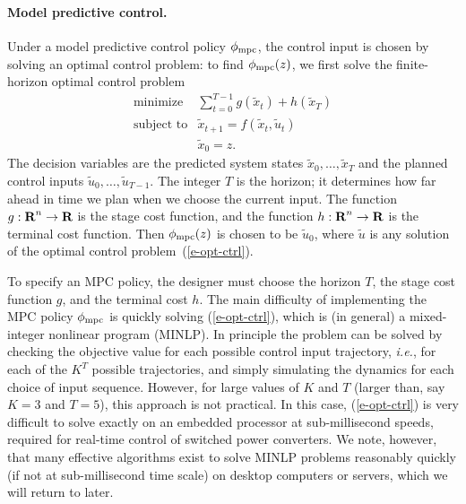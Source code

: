 \documentclass[12pt]{article}
\newcommand{\ie}{{\it i.e.}}
\newcommand{\reals}{{\mbox{\bf R}}}
\begin{document}
\paragraph{Model predictive control.}


Under a model predictive control policy $\phi_{\rm mpc}$,
the control input is chosen by solving an optimal control problem:
to find $\phi_{\rm mpc}(z)$,
we first solve the finite-horizon optimal control problem
\begin{equation}
\begin{array}{ll}
\mbox{minimize} & 
  \sum_{t=0}^{T - 1} g(\tilde x_t) + h(\tilde x_{T}) \\
\mbox{subject to} & \tilde x_{t+1} = f(\tilde x_t, \tilde u_t) \\
                  & \tilde x_0 = z.
\end{array}
\label{e-opt-ctrl}
\end{equation}
The decision variables are the predicted system states $\tilde x_{0}, \dots, \tilde x_{T}$
and the planned control inputs 
$\tilde u_0, \dots, \tilde u_{T-1}$.
The integer $T$ is the horizon; it determines how far ahead in time we plan
when we choose the current input.
The function $g: \reals^n \to \reals$ is the stage cost function,
and the function $h: \reals^n \to \reals$ is the terminal cost function.
Then $\phi_{\rm mpc}(z)$ is chosen to be $\tilde u_0$, where $\tilde u$ is
any solution of the optimal control problem~(\ref{e-opt-ctrl}).










To specify an MPC policy, the designer must choose the horizon $T$,
the stage cost function $g$, and the terminal cost $h$.
The main difficulty of implementing the MPC policy $\phi_{\rm mpc}$
is quickly solving (\ref{e-opt-ctrl}), 
which is (in general) a mixed-integer nonlinear program (MINLP).
In principle the problem can be solved by 
checking the objective value for each possible control input trajectory,
\ie, for each of the $K^T$ possible trajectories,
and simply simulating the dynamics for each choice of input sequence.
However, for large values of $K$ and $T$ (larger than, say $K =3$ and $T=5$),
this approach is not practical.
In this case, (\ref{e-opt-ctrl}) is very difficult to solve exactly 
on an embedded processor at sub-millisecond speeds,
required for real-time control of switched power converters.
We note, however, that many effective algorithms exist
to solve MINLP problems reasonably quickly 
(if not at sub-millisecond time scale) on desktop computers or servers,
which we will return to later.
\end{document}
